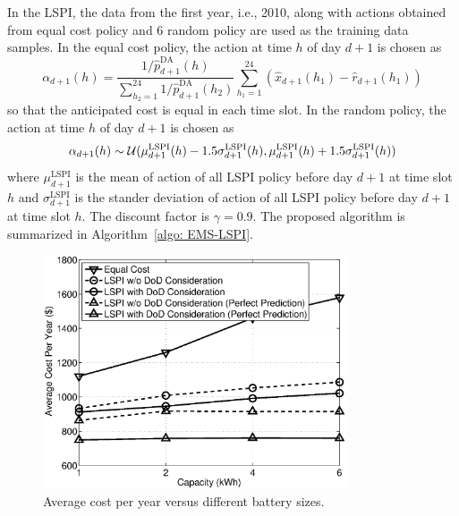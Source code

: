 In the LSPI, the data from the first year, i.e., 2010, along with actions obtained from equal cost policy and 6 random policy are used as the training data samples. In the equal cost policy, the action at time $h$ of day $d+1$ is chosen as
\begin{equation}\label{eq: equal cost policy}
    \alpha_{d+1}(h) = \frac{1/\hat{p}^\text{DA}_{d+1}(h)}{\sum_{h_2=1}^{24} 1/\hat{p}^\text{DA}_{d+1}(h_2)}\sum_{h_1=1}^{24}(\hat x_{d+1}(h_1)-\hat r_{d+1}(h_1))
\end{equation}
so that the anticipated cost is equal in each time slot. In the random policy, the action at time $h$ of day $d+1$ is chosen as
\begin{equation}
    \alpha_{d+1}(h) \sim \mathcal{U}(\mu^\text{LSPI}_{d+1}(h) - 1.5\sigma^\text{LSPI}_{d+1}(h), \mu^\text{LSPI}_{d+1}(h) + 1.5\sigma^\text{LSPI}_{d+1}(h))
\end{equation}
where $\mu^\text{LSPI}_{d+1}$ is the mean of action of all LSPI policy before day $d+1$ at time slot $h$ and $\sigma^\text{LSPI}_{d+1}$ is the stander deviation of action of all LSPI policy before day $d+1$ at time slot $h$. The discount factor is $\gamma=0.9$. The proposed algorithm is summarized in Algorithm~\ref{algo: EMS-LSPI}.

\begin{figure}[t]
  \centering
  \includegraphics[width = 0.8\textwidth]{fig/av_cost.eps}
  \caption{Average cost per year versus different battery sizes.}
  \label{fig: av_cost}
\end{figure}

